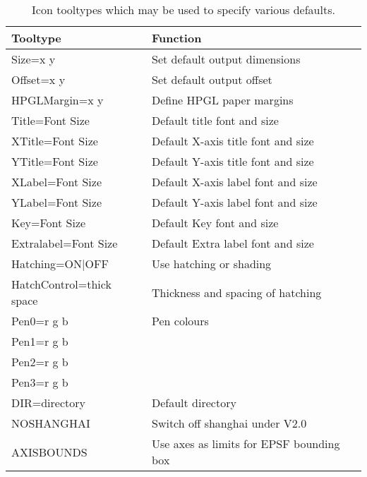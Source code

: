 \begin{table}
\begin{center}
\small
\begin{tabular}{ll} \hline
Tooltype                      &   Function                                 \\ \hline
Size=x y                      &   Set default output dimensions            \\
Offset=x y                    &   Set default output offset                \\
HPGLMargin=x y                &   Define HPGL paper margins                \\
Title=Font Size               &   Default title font and size              \\
XTitle=Font Size              &   Default X-axis title font and size       \\
YTitle=Font Size              &   Default Y-axis title font and size       \\
XLabel=Font Size              &   Default X-axis label font and size       \\
YLabel=Font Size              &   Default Y-axis label font and size       \\
Key=Font Size                 &   Default Key font and size                \\
Extralabel=Font Size          &   Default Extra label font and size        \\
Hatching=ON$\mid$OFF          &   Use hatching or shading                  \\
HatchControl=thick space      &   Thickness and spacing of hatching        \\
Pen0=r g b                    &   Pen colours                              \\
Pen1=r g b                    &                                            \\
Pen2=r g b                    &                                            \\
Pen3=r g b                    &                                            \\
DIR=directory                 &   Default directory                        \\
NOSHANGHAI                    &   Switch off shanghai under V2.0           \\ 
AXISBOUNDS                    &   Use axes as limits for EPSF bounding box \\ \hline
\end{tabular}
\end{center}
\caption[Icon tooltypes]{\label{tab:tooltypes} Icon tooltypes which may be used
to specify various defaults.}
\end{table}

